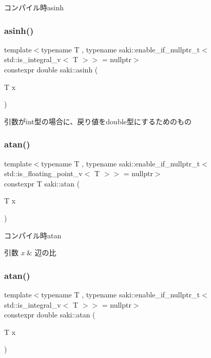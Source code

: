 コンパイル時asinh 

\mbox{\label{namespacesaki_aac840ca5d9b98ac0a8c5b15752f02072}} 
\subsubsection{\texorpdfstring{asinh()}{asinh()}\hspace{0.1cm}{\footnotesize\ttfamily [2/2]}}
{\footnotesize\ttfamily template$<$typename T , typename saki\+::enable\+\_\+if\+\_\+nullptr\+\_\+t$<$ std\+::is\+\_\+integral\+\_\+v$<$ T $>$$>$  = nullptr$>$ \\
constexpr double saki\+::asinh (\begin{DoxyParamCaption}\item[{T}]{x }\end{DoxyParamCaption})}



引数がint型の場合に、戻り値をdouble型にするためのもの 

\mbox{\label{namespacesaki_a524b9439c745f69bd8a8b681b03b4b01}} 
\subsubsection{\texorpdfstring{atan()}{atan()}\hspace{0.1cm}{\footnotesize\ttfamily [1/2]}}
{\footnotesize\ttfamily template$<$typename T , typename saki\+::enable\+\_\+if\+\_\+nullptr\+\_\+t$<$ std\+::is\+\_\+floating\+\_\+point\+\_\+v$<$ T $>$$>$  = nullptr$>$ \\
constexpr T saki\+::atan (\begin{DoxyParamCaption}\item[{T}]{x }\end{DoxyParamCaption})}



コンパイル時atan 


\begin{DoxyParams}{引数}
{\em x} & 辺の比 \\
\hline
\end{DoxyParams}
\mbox{\label{namespacesaki_acd8a08085fc9210a4e8d61f6c04febe2}} 
\subsubsection{\texorpdfstring{atan()}{atan()}\hspace{0.1cm}{\footnotesize\ttfamily [2/2]}}
{\footnotesize\ttfamily template$<$typename T , typename saki\+::enable\+\_\+if\+\_\+nullptr\+\_\+t$<$ std\+::is\+\_\+integral\+\_\+v$<$ T $>$$>$  = nullptr$>$ \\
constexpr double saki\+::atan (\begin{DoxyParamCaption}\item[{T}]{x }\end{DoxyParamCaption})}



